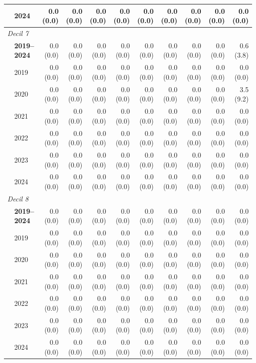\begin{table}[htbp]
\begin{tabular}{llrrrrrrrrr}
 & 2024 & 0.0 (0.0) & 0.0 (0.0) & 0.0 (0.0) & 0.0 (0.0) & 0.0 (0.0) & 0.0 (0.0) & 0.0 (0.0) & 0.0 (0.0) & 0.0 (0.0) \\
\midrule
\multicolumn{11}{l}{\textit{Decil 7}} \\
 & \textbf{2019–2024} & 0.0 (0.0) & 0.0 (0.0) & 0.0 (0.0) & 0.0 (0.0) & 0.0 (0.0) & 0.0 (0.0) & 0.0 (0.0) & 0.0 (0.0) & 0.6 (3.8) \\
 & 2019 & 0.0 (0.0) & 0.0 (0.0) & 0.0 (0.0) & 0.0 (0.0) & 0.0 (0.0) & 0.0 (0.0) & 0.0 (0.0) & 0.0 (0.0) & 0.0 (0.0) \\
 & 2020 & 0.0 (0.0) & 0.0 (0.0) & 0.0 (0.0) & 0.0 (0.0) & 0.0 (0.0) & 0.0 (0.0) & 0.0 (0.0) & 0.0 (0.0) & 3.5 (9.2) \\
 & 2021 & 0.0 (0.0) & 0.0 (0.0) & 0.0 (0.0) & 0.0 (0.0) & 0.0 (0.0) & 0.0 (0.0) & 0.0 (0.0) & 0.0 (0.0) & 0.0 (0.0) \\
 & 2022 & 0.0 (0.0) & 0.0 (0.0) & 0.0 (0.0) & 0.0 (0.0) & 0.0 (0.0) & 0.0 (0.0) & 0.0 (0.0) & 0.0 (0.0) & 0.0 (0.0) \\
 & 2023 & 0.0 (0.0) & 0.0 (0.0) & 0.0 (0.0) & 0.0 (0.0) & 0.0 (0.0) & 0.0 (0.0) & 0.0 (0.0) & 0.0 (0.0) & 0.0 (0.0) \\
 & 2024 & 0.0 (0.0) & 0.0 (0.0) & 0.0 (0.0) & 0.0 (0.0) & 0.0 (0.0) & 0.0 (0.0) & 0.0 (0.0) & 0.0 (0.0) & 0.0 (0.0) \\
\midrule
\multicolumn{11}{l}{\textit{Decil 8}} \\
 & \textbf{2019–2024} & 0.0 (0.0) & 0.0 (0.0) & 0.0 (0.0) & 0.0 (0.0) & 0.0 (0.0) & 0.0 (0.0) & 0.0 (0.0) & 0.0 (0.0) & 0.0 (0.0) \\
 & 2019 & 0.0 (0.0) & 0.0 (0.0) & 0.0 (0.0) & 0.0 (0.0) & 0.0 (0.0) & 0.0 (0.0) & 0.0 (0.0) & 0.0 (0.0) & 0.0 (0.0) \\
 & 2020 & 0.0 (0.0) & 0.0 (0.0) & 0.0 (0.0) & 0.0 (0.0) & 0.0 (0.0) & 0.0 (0.0) & 0.0 (0.0) & 0.0 (0.0) & 0.0 (0.0) \\
 & 2021 & 0.0 (0.0) & 0.0 (0.0) & 0.0 (0.0) & 0.0 (0.0) & 0.0 (0.0) & 0.0 (0.0) & 0.0 (0.0) & 0.0 (0.0) & 0.0 (0.0) \\
 & 2022 & 0.0 (0.0) & 0.0 (0.0) & 0.0 (0.0) & 0.0 (0.0) & 0.0 (0.0) & 0.0 (0.0) & 0.0 (0.0) & 0.0 (0.0) & 0.0 (0.0) \\
 & 2023 & 0.0 (0.0) & 0.0 (0.0) & 0.0 (0.0) & 0.0 (0.0) & 0.0 (0.0) & 0.0 (0.0) & 0.0 (0.0) & 0.0 (0.0) & 0.0 (0.0) \\
 & 2024 & 0.0 (0.0) & 0.0 (0.0) & 0.0 (0.0) & 0.0 (0.0) & 0.0 (0.0) & 0.0 (0.0) & 0.0 (0.0) & 0.0 (0.0) & 0.0 (0.0) \\
\midrule

\end{tabular}
\end{table}
